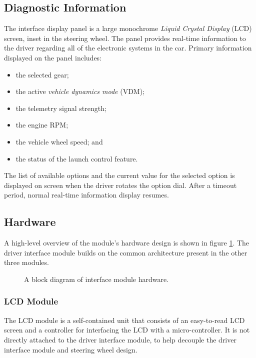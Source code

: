 \subsection{Diagnostic Information}
\label{sec:interface_diag}

The interface display panel is a large monochrome \emph{Liquid Crystal Display} (LCD) screen, inset in the steering wheel. The panel provides real-time information to the driver regarding all of the electronic systems in the car. Primary information displayed on the panel includes:

\begin{itemize}
\item the selected gear;
\item the active \emph{vehicle dynamics mode} (VDM);
\item the telemetry signal strength;
\item the engine RPM;
\item the vehicle wheel speed; and
\item the status of the launch control feature.
\end{itemize}

The list of available options and the current value for the selected option is displayed on screen when the driver rotates the option dial. After a timeout period, normal real-time information display resumes. 

\subsection{Hardware}

A high-level overview of the module's hardware design is shown in figure \ref{fig:interface_hardware_design_block}. The driver interface module builds on the common architecture present in the other three modules. 

\begin{figure}[H]
\centering
%
\caption{A block diagram of interface module hardware.}
\label{fig:interface_hardware_design_block}
\end{figure}

\subsubsection{LCD Module}

The LCD module is a self-contained unit that consists of an easy-to-read LCD screen and a controller for interfacing the LCD with a micro-controller. It is not directly attached to the driver interface module, to help decouple the driver interface module and steering wheel design.

